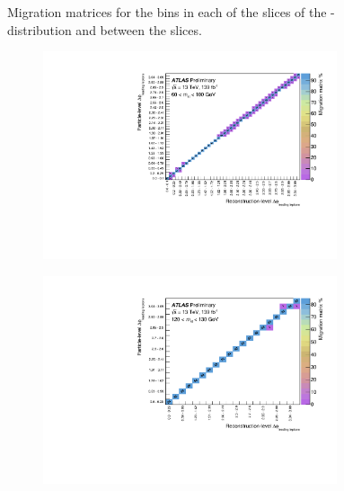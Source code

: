 \begin{figure}[htb]
    \caption{Migration matrices for the \dYPairs bins in each of the \mFourL slices of the \dYPairs-\mFourL distribution and between the slices.}
\end{figure}



\begin{figure}[htb]
  \centering
  \begin{subfigure}{.49\textwidth}\centering\includegraphics[width = 0.95\textwidth]{Figures/m4l/UnfoldingStudies/v014_matrices/deltaPhiLeadingLeptons_m4l60-100Matrix.pdf}\end{subfigure}
  \begin{subfigure}{.49\textwidth}\centering\includegraphics[width = 0.95\textwidth]{Figures/m4l/UnfoldingStudies/v014_matrices/deltaPhiLeadingLeptons_m4l120-130Matrix.pdf}\end{subfigure}

\end{figure}
